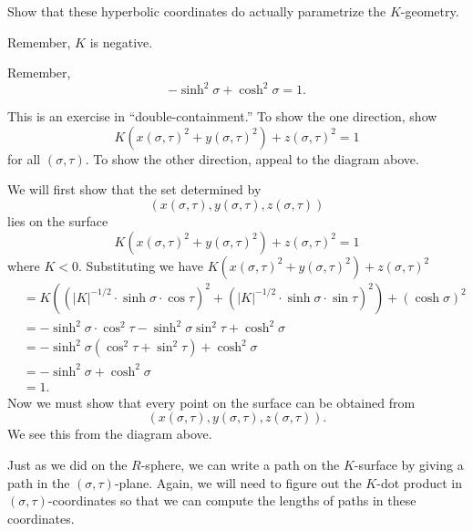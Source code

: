 \documentclass{ximera}
\begin{document}
\begin{problem}
Show that these hyperbolic coordinates do actually parametrize the
$K$-geometry.
\begin{hint}
  Remember, $K$ is negative.
\end{hint}
\begin{hint}
  Remember,
  \[
  -\sinh^2\sigma + \cosh^2\sigma =1.
  \]
\end{hint}
\begin{hint}
  This is an exercise in ``double-containment.'' To show the one
  direction, show
\[
K\left(x(\sigma,\tau)^{2}+y(\sigma,\tau)^{2}\right)+z(\sigma,\tau)^{2}
= 1
\]
for all $(\sigma,\tau)$. To show the other direction, appeal to the
diagram above.
\end{hint}
\begin{freeResponse}
  We will first show that the set determined by
  \[
  \left(x(\sigma,\tau), y(\sigma,\tau), z(\sigma,\tau)\right)
  \]
  lies on the surface
  \[
  K\left(x(\sigma,\tau) ^{2}+y(\sigma,\tau) ^{2}\right) +z(\sigma,\tau)^{2} = 1
  \]
  where $K<0$. Substituting we have
  $K\left(x(\sigma,\tau) ^{2}+y(\sigma,\tau) ^{2}\right)
  +z(\sigma,\tau)^{2}$
  \begin{align*}
    &=K\left((|K|^{-1/2}\cdot\sinh\sigma\cdot\cos\tau)^{2}+(|K|^{-1/2}\cdot\sinh\sigma\cdot\sin\tau)^{2}\right) +(\cosh\sigma)^{2} \\
    &= -\sinh^2\sigma\cdot\cos^2\tau-\sinh^2\sigma\sin^2\tau + \cosh^2\sigma \\
    &= -\sinh^2\sigma(\cos^2\tau+\sin^2\tau) + \cosh^2\sigma \\
    &= -\sinh^2\sigma + \cosh^2\sigma \\
    &=1.
  \end{align*}
  Now we must show that every point on the surface can be obtained from
  \[
  \left(x(\sigma,\tau), y(\sigma,\tau), z(\sigma,\tau)\right).
  \]
  We see this from the diagram above. 
\end{freeResponse}
\end{problem}

Just as we did on the $R$-sphere, we can write a path on the
$K$-surface by giving a path in the $(\sigma,\tau)$-plane. Again, we
will need to figure out the $K$-dot product in
$(\sigma,\tau)$-coordinates so that we can compute the lengths of
paths in these coordinates.
\end{document}
